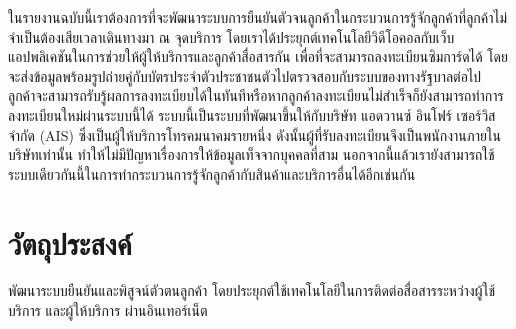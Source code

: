 ในรายงานฉบับนี้เราต้องการที่จะพัฒนาระบบการยืนยันตัวจนลูกค้าในกระบวนการรู้จักลูกค้าที่ลูกค้าไม่จำเป็นต้องเสียเวลาเดินทางมา ณ จุดบริการ โดยเราได้ประยุกต์เทคโนโลยีวิดีโอคอลกับเว็บแอปพลิเคชันในการช่วยให้ผู้ให้บริการและลูกค้าสื่อสารกัน เพื่อที่จะสามารถลงทะเบียนซิมการ์ดได้ โดยจะส่งข้อมูลพร้อมรูปถ่ายคู่กับบัตรประจำตัวประชาชนตัวไปตรวจสอบกับระบบของทางรัฐบาลต่อไป ลูกค้าจะสามารถรับรู้ผลการลงทะเบียบได้ในทันทีหรือหากลูกค้าลงทะเบียนไม่สำเร็จก็ยังสามารถทำการลงทะเบียนใหม่ผ่านระบบนี้ได้ ระบบนี้เป็นระบบที่พัฒนาขึ้นให้กับบริษัท แอดวานซ์ อินโฟร์ เซอร์วิส จำกัด (AIS) ซึ่งเป็นผู้ให้บริการโทรคมนาคมรายหนึ่ง ดังนั้นผู้ที่รับลงทะเบียนจึงเป็นพนักงานภายในบริษัทเท่านั้น ทำให้ไม่มีปัญหาเรื่องการให้ข้อมูลเท็จจากบุคคลที่สาม นอกจากนี้แล้วเรายังสามารถใช้ระบบเดียวกันนี้ในการทำกระบวนการรู้จักลูกค้ากับสินค้าและบริการอื่นได้อีกเช่นกัน

\section{วัตถุประสงค์}

พัฒนาระบบยืนยันและพิสูจน์ตัวตนลูกค้า โดยประยุกต์ใช้เทคโนโลยีในการติดต่อสื่อสารระหว่างผู้ใช้บริการ และผู้ให้บริการ ผ่านอินเทอร์เน็ต